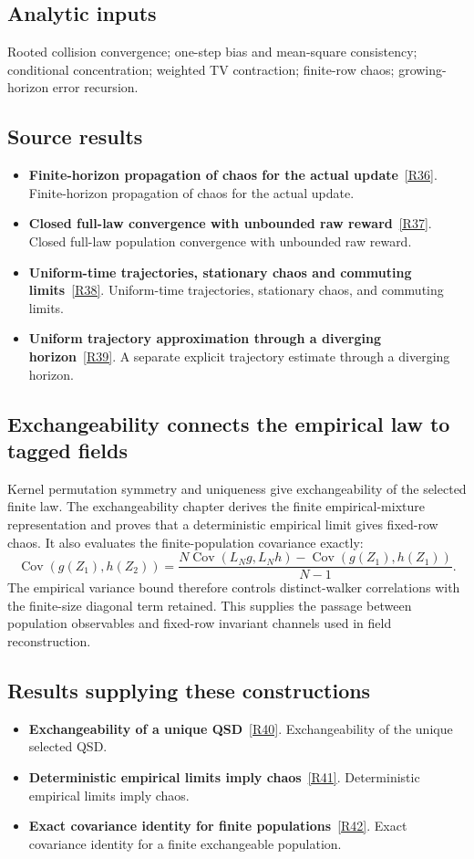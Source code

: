 \documentclass[11pt,a4paper]{article}
\begin{document}
\subsection*{Analytic inputs}
Rooted collision convergence; one-step bias and mean-square consistency; conditional concentration; weighted TV contraction; finite-row chaos; growing-horizon error recursion.
\subsection*{Source results}
\begin{itemize}
\item \textbf{Finite-horizon propagation of chaos for the actual update}~\hyperref[src:thm-chaos-finite-time-consistency]{[R36]}. Finite-horizon propagation of chaos for the actual update.
\item \textbf{Closed full-law convergence with unbounded raw reward}~\hyperref[src:thm-slcw-active-contraction]{[R37]}. Closed full-law population convergence with unbounded raw reward.
\item \textbf{Uniform-time trajectories, stationary chaos and commuting limits}~\hyperref[src:cor-slcw-trajectories]{[R38]}. Uniform-time trajectories, stationary chaos, and commuting limits.
\item \textbf{Uniform trajectory approximation through a diverging horizon}~\hyperref[src:thm-slcgt-growing-trajectory]{[R39]}. A separate explicit trajectory estimate through a diverging horizon.
\end{itemize}
\subsection*{Exchangeability connects the empirical law to tagged fields}
Kernel permutation symmetry and uniqueness give exchangeability of the selected finite law. The exchangeability chapter derives the finite empirical-mixture representation and proves that a deterministic empirical limit gives fixed-row chaos. It also evaluates the finite-population covariance exactly:
\[
\operatorname{Cov}(g(Z_1),h(Z_2))
=\frac{N\operatorname{Cov}(L_Ng,L_Nh)
-\operatorname{Cov}(g(Z_1),h(Z_1))}{N-1}.
\]
The empirical variance bound therefore controls distinct-walker correlations with the finite-size diagonal term retained. This supplies the passage between population observables and fixed-row invariant channels used in field reconstruction.
\subsection*{Results supplying these constructions}
\begin{itemize}
\item \textbf{Exchangeability of a unique QSD}~\hyperref[src:thm-qsd-exchangeability]{[R40]}. Exchangeability of the unique selected QSD.
\item \textbf{Deterministic empirical limits imply chaos}~\hyperref[src:thm-propagation-chaos-qsd]{[R41]}. Deterministic empirical limits imply chaos.
\item \textbf{Exact covariance identity for finite populations}~\hyperref[src:thm-correlation-decay]{[R42]}. Exact covariance identity for a finite exchangeable population.
\end{itemize}
\end{document}
